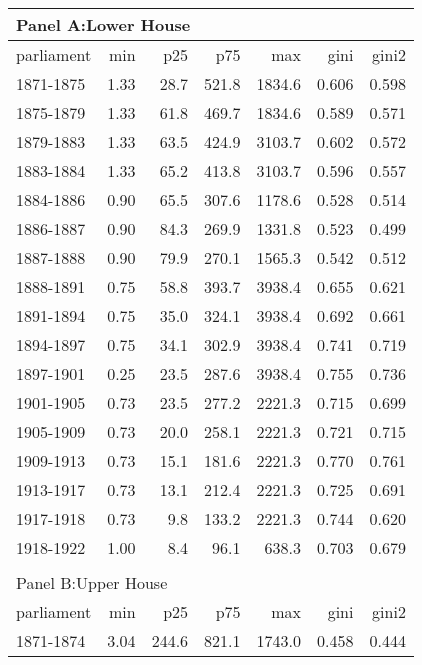 \begin{table}[ht]
\centering
\begingroup\footnotesize
\begin{tabular}{lrrrrrr}
   
\multicolumn{7}{l}{Panel A:Lower House}\\ 
\hline
parliament & min & p25 & p75 & max & gini & gini2 \\\hline

1871-1875 & 1.33 & 28.7 & 521.8 & 1834.6 & 0.606 & 0.598 \\ 
  1875-1879 & 1.33 & 61.8 & 469.7 & 1834.6 & 0.589 & 0.571 \\ 
  1879-1883 & 1.33 & 63.5 & 424.9 & 3103.7 & 0.602 & 0.572 \\ 
  1883-1884 & 1.33 & 65.2 & 413.8 & 3103.7 & 0.596 & 0.557 \\ 
  1884-1886 & 0.90 & 65.5 & 307.6 & 1178.6 & 0.528 & 0.514 \\ 
  1886-1887 & 0.90 & 84.3 & 269.9 & 1331.8 & 0.523 & 0.499 \\ 
  1887-1888 & 0.90 & 79.9 & 270.1 & 1565.3 & 0.542 & 0.512 \\ 
  1888-1891 & 0.75 & 58.8 & 393.7 & 3938.4 & 0.655 & 0.621 \\ 
  1891-1894 & 0.75 & 35.0 & 324.1 & 3938.4 & 0.692 & 0.661 \\ 
  1894-1897 & 0.75 & 34.1 & 302.9 & 3938.4 & 0.741 & 0.719 \\ 
  1897-1901 & 0.25 & 23.5 & 287.6 & 3938.4 & 0.755 & 0.736 \\ 
  1901-1905 & 0.73 & 23.5 & 277.2 & 2221.3 & 0.715 & 0.699 \\ 
  1905-1909 & 0.73 & 20.0 & 258.1 & 2221.3 & 0.721 & 0.715 \\ 
  1909-1913 & 0.73 & 15.1 & 181.6 & 2221.3 & 0.770 & 0.761 \\ 
  1913-1917 & 0.73 & 13.1 & 212.4 & 2221.3 & 0.725 & 0.691 \\ 
  1917-1918 & 0.73 & 9.8 & 133.2 & 2221.3 & 0.744 & 0.620 \\ 
  1918-1922 & 1.00 & 8.4 & 96.1 & 638.3 & 0.703 & 0.679 \\ 
   \hline\\ 
\multicolumn{7}{l}{Panel B:Upper House}\\ 
\hline
parliament & min & p25 & p75 & max & gini & gini2 \\\hline
1871-1874 & 3.04 & 244.6 & 821.1 & 1743.0 & 0.458 & 0.444 \\ 

\end{tabular}
\end{table}
